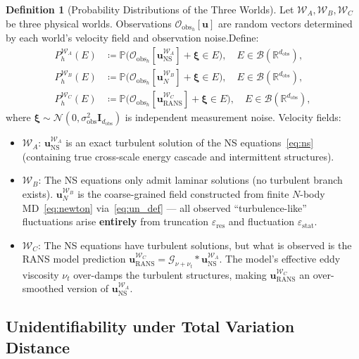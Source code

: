 \documentclass[11pt,a4paper]{article}
\theoremstyle{definition}
\newtheorem{definition}[theorem]{Definition}
\theoremstyle{remark}
\newcommand{\R}{\mathbb{R}}
\newcommand{\Obs}{\mathcal{O}_{\text{obs}}}
\newcommand{\uN}{\bm{u}_N}
\newcommand{\uNS}{\bm{u}_{\text{NS}}}
\newcommand{\uRANS}{\bm{u}_{\text{RANS}}}
\newcommand{\epsRes}{\varepsilon_{\text{res}}}
\newcommand{\epsStat}{\varepsilon_{\text{stat}}}
\begin{document}
\begin{definition}[Probability Distributions of the Three Worlds]
\label{def:worlds}
Let $\mathcal{W}_A, \mathcal{W}_B, \mathcal{W}_C$ be three physical worlds. Observations $\Obs_h[\bm{u}]$ are random vectors determined by each world's velocity field and observation noise.Define:
\begin{align}
  P_h^{\mathcal{W}_A}(E) &\coloneqq \mathbb{P}\bigl(\Obs_h[\uNS^{\mathcal{W}_A}] + \bm{\xi} \in E\bigr),
    \quad E \in \mathscr{B}(\R^{d_{\text{obs}}}), \label{eq:P_A}\\
  P_h^{\mathcal{W}_B}(E) &\coloneqq \mathbb{P}\bigl(\Obs_h[\uN^{\mathcal{W}_B}] + \bm{\xi} \in E\bigr),
    \quad E \in \mathscr{B}(\R^{d_{\text{obs}}}), \label{eq:P_B}\\
  P_h^{\mathcal{W}_C}(E) &\coloneqq \mathbb{P}\bigl(\Obs_h[\uRANS^{\mathcal{W}_C}] + \bm{\xi} \in E\bigr),
    \quad E \in \mathscr{B}(\R^{d_{\text{obs}}}), \label{eq:P_C}
\end{align}
where $\bm{\xi} \sim \mathcal{N}(0, \sigma_{\text{obs}}^2 \bm{I}_{d_{\text{obs}}})$ is independent measurement noise. Velocity fields:
\begin{itemize}[leftmargin=*]
  \item $\mathcal{W}_A$: $\uNS^{\mathcal{W}_A}$ is an exact turbulent solution of the NS equations~\eqref{eq:ns} (containing true cross-scale energy cascade and intermittent structures).
  \item $\mathcal{W}_B$: The NS equations only admit laminar solutions (no turbulent branch exists). $\uN^{\mathcal{W}_B}$ is the coarse-grained field constructed from finite $N$-body MD~\eqref{eq:newton} via~\eqref{eq:un_def} --- all observed ``turbulence-like'' fluctuations arise \textbf{entirely} from truncation $\epsRes$ and fluctuation $\epsStat$.
  \item $\mathcal{W}_C$: The NS equations have turbulent solutions, but what is observed is the RANS model prediction $\uRANS^{\mathcal{W}_C} = \mathcal{G}_{\nu+\nu_t} * \uNS^{\mathcal{W}_A}$. The model's effective eddy viscosity $\nu_t$ over-damps the turbulent structures, making $\uRANS^{\mathcal{W}_C}$ an over-smoothed version of $\uNS^{\mathcal{W}_A}$.
\end{itemize}
\end{definition}

\subsection{Unidentifiability under Total Variation Distance}
\end{document}
